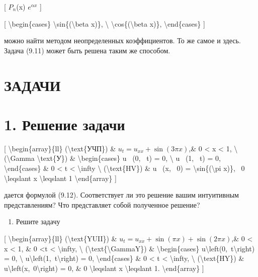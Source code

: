 \documentclass[
]{article}
\providecommand{\tightlist}{%
  \setlength{\itemsep}{0pt}\setlength{\parskip}{0pt}}
\begin{document}
{{{[} \(P_n\)(x) \(e^{\alpha x}\) {]}

{[} \textbackslash begin\{cases\}
\textbackslash sin\{(\textbackslash beta x)\}, \textbackslash{}
\textbackslash cos\{(\textbackslash beta x)\},
\textbackslash end\{cases\} {]}

можно найти методом неопределенных коэффициентов. То же самое и здесь.
Задача (9.11) может быть решена таким же способом.

\section{ЗАДАЧИ}\label{ux437ux430ux434ux430ux447ux438}

\section{1. Решение
задачи}\label{ux440ux435ux448ux435ux43dux438ux435-ux437ux430ux434ux430ux447ux438}

{[} \textbackslash begin\{array\}\{ll\} (\textbackslash text\{УЧП\}) \&
\(u_t = u_{xx} + \sin{(3\pi x)}\),\& 0 \textless{} x \textless{} 1,
\textbackslash{} (\textbackslash Gamma \textbackslash text\{У\}) \&
\textbackslash begin\{cases\} u ~(0, ~t) = 0, \textbackslash{} u ~(1,
~t) = 0, \textbackslash end\{cases\} \& 0 \textless{} t \textless{}
\textbackslash infty \textbackslash{} (\textbackslash text\{HV\}) \& u
~(x, ~0) = \textbackslash sin\{(\textbackslash pi x)\}, ~0
\textbackslash leqslant x \textbackslash leqslant 1
\textbackslash end\{array\} {]}

дается формулой (9.12). Соответствует ли это решение вашим интуитивным
представлениям? Что представляет собой полученное решение?

\begin{enumerate}
\def\labelenumi{\arabic{enumi}.}
\setcounter{enumi}{1}
\tightlist
\item
  Решите задачу
\end{enumerate}

{[} \textbackslash begin\{array\}\{ll\} (\textbackslash text\{YUII\}) \&
\(u_t = u_{xx} + \sin{(\pi x)} + \sin{(2\pi x)}\),\& 0 \textless{} x
\textless{} 1, \& 0 \textless t \textless{} \textbackslash infty,
\textbackslash{} (\textbackslash text\{\textbackslash GammaY\}) \&
\textbackslash begin\{cases\}
u\textbackslash left(0,~t\textbackslash right) = 0, \textbackslash{}
u\textbackslash left(1,~t\textbackslash right) = 0,
\textbackslash end\{cases\} \& 0 \textless{} t \textless{}
\textbackslash infty, \textbackslash{} (\textbackslash text\{HY\}) \&
u\textbackslash left(x,~0\textbackslash right) = 0, \& 0
\textbackslash leqslant x \textbackslash leqslant 1.
\textbackslash end\{array\} {]}

}}
\end{document}
